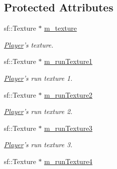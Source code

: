 \subsection*{Protected Attributes}
\begin{DoxyCompactItemize}
\item 
\hypertarget{class_player_aba34d2ce20f5ab84c38c287a7e16e497}{sf\-::\-Texture $\ast$ \hyperlink{class_player_aba34d2ce20f5ab84c38c287a7e16e497}{m\-\_\-texture}}\label{class_player_aba34d2ce20f5ab84c38c287a7e16e497}

\begin{DoxyCompactList}\small\item\em \hyperlink{class_player}{Player}'s texture. \end{DoxyCompactList}\item 
\hypertarget{class_player_ab1123072990bf0605849f6e4a66550da}{sf\-::\-Texture $\ast$ \hyperlink{class_player_ab1123072990bf0605849f6e4a66550da}{m\-\_\-run\-Texture1}}\label{class_player_ab1123072990bf0605849f6e4a66550da}

\begin{DoxyCompactList}\small\item\em \hyperlink{class_player}{Player}'s run texture 1. \end{DoxyCompactList}\item 
\hypertarget{class_player_af470f29584a4b4a994cdbcbd8572b1f6}{sf\-::\-Texture $\ast$ \hyperlink{class_player_af470f29584a4b4a994cdbcbd8572b1f6}{m\-\_\-run\-Texture2}}\label{class_player_af470f29584a4b4a994cdbcbd8572b1f6}

\begin{DoxyCompactList}\small\item\em \hyperlink{class_player}{Player}'s run texture 2. \end{DoxyCompactList}\item 
\hypertarget{class_player_abd4d5c0efb97dd1342969bfb5e935c84}{sf\-::\-Texture $\ast$ \hyperlink{class_player_abd4d5c0efb97dd1342969bfb5e935c84}{m\-\_\-run\-Texture3}}\label{class_player_abd4d5c0efb97dd1342969bfb5e935c84}

\begin{DoxyCompactList}\small\item\em \hyperlink{class_player}{Player}'s run texture 3. \end{DoxyCompactList}\item 
\hypertarget{class_player_a556553a62c2db12bb1b57721e59a58d7}{sf\-::\-Texture $\ast$ \hyperlink{class_player_a556553a62c2db12bb1b57721e59a58d7}{m\-\_\-run\-Texture4}}\label{class_player_a556553a62c2db12bb1b57721e59a58d7}


\end{DoxyCompactItemize}
